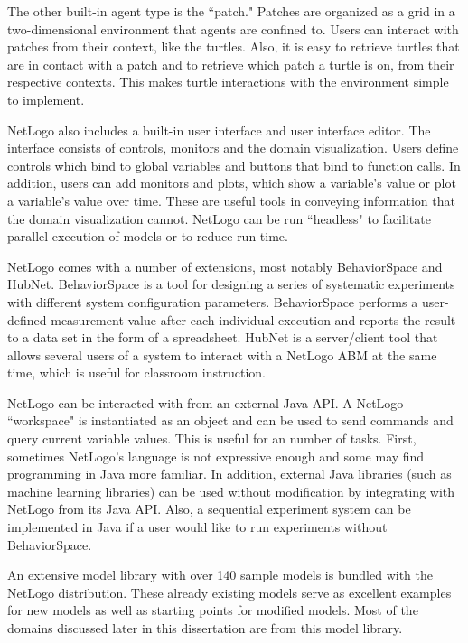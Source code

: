 The other built-in agent type is the ``patch."
Patches are organized as a grid in a two-dimensional environment that agents are confined to.
Users can interact with patches from their context, like the turtles.
Also, it is easy to retrieve turtles that are in contact with a patch and to retrieve which patch a turtle is on, from their respective contexts.
This makes turtle interactions with the environment simple to implement.

NetLogo also includes a built-in user interface and user interface editor.
The interface consists of controls, monitors and the domain visualization.
Users define controls which bind to global variables and buttons that bind to function calls.
In addition, users can add monitors and plots, which show a variable's value or plot a variable's value over time.
These are useful tools in conveying information that the domain visualization cannot.
NetLogo can be run ``headless" to facilitate parallel execution of models or to reduce run-time.

NetLogo comes with a number of extensions, most notably BehaviorSpace and HubNet.
BehaviorSpace is a tool for designing a series of systematic experiments with different system configuration parameters.
BehaviorSpace performs a user-defined measurement value after each individual execution and reports the result to a data set in the form of a spreadsheet.
HubNet is a server/client tool that allows several users of a system to interact with a NetLogo ABM at the same time, which is useful for classroom instruction.

NetLogo can be interacted with from an external Java API.
A NetLogo ``workspace" is instantiated as an object and can be used to send commands and query current variable values.
This is useful for an number of tasks.
First, sometimes NetLogo's language is not expressive enough and some may find programming in Java more familiar.
In addition, external Java libraries (such as machine learning libraries) can be used without modification by integrating with NetLogo from its Java API.
Also, a sequential experiment system can be implemented in Java if a user would like to run experiments without BehaviorSpace.

An extensive model library with over 140 sample models is bundled with the NetLogo distribution.
These already existing models serve as excellent examples for new models as well as starting points for modified models.
Most of the domains discussed later in this dissertation are from this model library.

